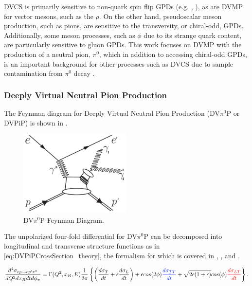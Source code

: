         DVCS is primarily sensitive to non-quark spin flip GPDs (e.g. \GPDH, \GPDE), as are DVMP for vector mesons, such as the $\rho$. On the other hand, pseudoscalar meson production, such as pions, are sensitive to the transversity, or chiral-odd, GPDs. Additionally, some meson processes, such as $\phi$ due to its strange quark content, are particularly sensitive to gluon GPDs. This work focuses on DVMP with the production of a neutral pion, $\pi^0$, which in addition to accessing chiral-odd GPDs, is an important background for other processes such as DVCS due to sample contamination from $\pi^0$ decay \parencite{Lee2022MeasurementDetector}.
        
        \subsubsection*{Deeply Virtual Neutral Pion Production}
            The Feynman diagram for Deeply Virtual Neutral Pion Production (DV$\pi^0$P or DVPiP) is shown in . 

            \begin{figure}[H]
                \centering
                \includegraphics[width=0.5\textwidth]{Chapters/Ch1-Intro/Ch1-Sec2-GPDs-DVMP/pics/dvPiP_Feynman_diagram_2.jpg}
                \caption[DVPiP Feynman Diagram]{DV$\pi^0$P Feynman Diagram.}
                \label{fig:DVPiP_diagram}
            \end{figure}

            The unpolarized four-fold differential \xsec for DV$\pi^0$P can be decomposed into longitudinal and transverse structure functions as in \eqref{eq:DVPiPCrossSection_theory}, the formalism for which is covered in \parencite{Donnachie1978GeneralizedDominance}, \parencite{Dreschsel1992ThresholdNucleons}, and \parencite{Donnelly2023GeneralResponses}. 
            
 
            \begin{equation}\labelAndRemember{eq:DVPiPCrossSection_theory}
                   {\frac{d^4\sigma_{ep \rightarrow ep'\pi^0}}{dQ^2dx_Bdtd\phi_{\pi}} =
                 \Gamma (Q^2, x_B, E)
                 \frac{1}{2\pi}
                 \left\{ \left(  \textcolor{sigmaT}{\frac{d\sigma_T}{dt}}+\epsilon  \textcolor{sigmaL}{\frac{d\sigma_L}{dt}} \right)+
                 \epsilon cos(2\phi)  \textcolor{sigmaTT}{\frac{d\sigma_{TT}}{dt}} + 
                 \sqrt{2\epsilon(1+\epsilon)} cos(\phi)  \textcolor{sigmaLT}{\frac{d\sigma_{LT}}{dt}} \right\}}.
             \end{equation}      


